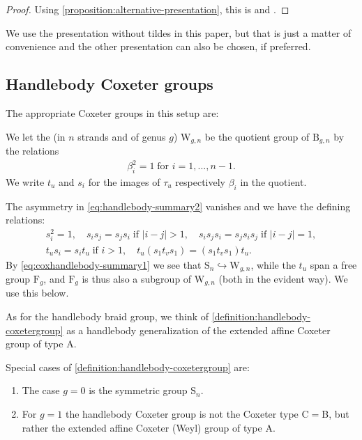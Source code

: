 \documentclass[a4paper,11pt]{amsart}
\let\emph\relax
\renewcommand{\dots}{\text{...}}
\newcommand{\setstuff}[1]{\mathrm{#1}}
\numberwithin{equation}{section}
\let\fullref\autoref
\begin{document}
\begin{proof}
Using \fullref{proposition:alternative-presentation}, this is 
\cite[Theorem 1]{Ve-handlebodies}
and \cite[Section 5]{La-handlebodies}.
\end{proof}

We use the presentation without tildes in this paper, but that is just a 
matter of convenience and the other presentation can also be chosen, if preferred.

\subsection{Handlebody Coxeter groups}\label{subsection:coxdia}

The appropriate Coxeter groups in this setup are:

\begin{definition}\label{definition:handlebody-coxetergroup}
We let the \emph{handlebody Coxeter group} (in $n$ strands and of genus $g$)
$\setstuff{W}_{g,n}$ be the quotient group of 
$\setstuff{B}_{g,n}$ by the relations
\begin{gather*}
\beta_{i}^{2}=1
\;\text{for }i=1,\dots,n-1.
\end{gather*}
We write $t_{u}$ and $s_{i}$ for the images of 
$\tau_{u}$ respectively $\beta_{i}$ in the quotient.
\end{definition}

The asymmetry in \eqref{eq:handlebody-summary2} 
vanishes and we have the defining relations:
\begin{gather}
\label{eq:coxhandlebody-summary1}
s_{i}^{2}=1
,\quad
s_{i}s_{j}=s_{j}s_{i}\;\text{if }|i-j|>1,
\quad
s_{i}s_{j}s_{i}=s_{j}s_{i}s_{j}\;\text{if }|i-j|=1,
\\
\label{eq:coxhandlebody-summary2}
t_{u}s_{i}
=s_{i}t_{u}\;\text{if }i>1,
\quad
t_{u}(s_{1}t_{v}s_{1})
=(s_{1}t_{v}s_{1})t_{u}
.
\end{gather}
By \eqref{eq:coxhandlebody-summary1}
we see that $\setstuff{S}_{n}\hookrightarrow\setstuff{W}_{g,n}$,
while the $t_{u}$ span a free group $\setstuff{F}_{g}$, 
and $\setstuff{F}_{g}$ is thus also a subgroup of $\setstuff{W}_{g,n}$
(both in the evident way). We use this below.

As for the handlebody braid group, we think of \fullref{definition:handlebody-coxetergroup} as a 
handlebody generalization of the extended affine Coxeter group of type A. 

\begin{remark}
Special cases of \fullref{definition:handlebody-coxetergroup} are:
\begin{enumerate}

\setlength\itemsep{0.15cm}

\item The case $g=0$ is the symmetric group $\setstuff{S}_{n}$.

\item For $g=1$ the handlebody Coxeter group is not the 
Coxeter type C$=$B, but rather the extended affine 
Coxeter (Weyl) group of type A.

\end{enumerate}
\end{remark}
\end{document}
